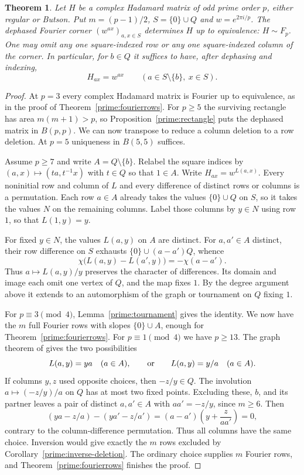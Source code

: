 \documentclass[11pt,a4paper]{article}
\newtheorem{theorem}{Theorem}[section]
\numberwithin{equation}{section}
\begin{document}
\begin{theorem}\label{prime:corner}
Let $H$ be a complex Hadamard matrix of odd prime order $p$, either regular or Butson. Put $m=(p-1)/2$, $S=\{0\}\cup Q$ and $w=e^{2\pi i/p}$. The dephased Fourier corner $(w^{ax})_{a,x\in S}$ determines $H$ up to equivalence: $H\sim F_p$. One may omit any one square-indexed row or any one square-indexed column of the corner. In particular, for $b\in Q$ it suffices to have, after dephasing and indexing,
$$H_{ax}=w^{ax}\qquad(a\in S\setminus\{b\},\ x\in S).$$
\end{theorem}
\begin{proof}
At $p=3$ every complex Hadamard matrix is Fourier up to equivalence, as in the proof of Theorem~\ref{prime:fourierrows}. For $p\ge5$ the surviving rectangle has area $m(m+1)>p$, so Proposition~\ref{prime:rectangle} puts the dephased matrix in $B(p,p)$. We can now transpose to reduce a column deletion to a row deletion. At $p=5$ uniqueness in $B(5,5)$ \cite{hkm} suffices.

Assume $p\ge7$ and write $A=Q\setminus\{b\}$. Relabel the square indices by $(a,x)\mapsto(ta,t^{-1}x)$ with $t\in Q$ so that $1\in A$. Write $H_{ax}=w^{L(a,x)}$. Every noninitial row and column of $L$ and every difference of distinct rows or columns is a permutation. Each row $a\in A$ already takes the values $\{0\}\cup Q$ on $S$, so it takes the values $N$ on the remaining columns. Label those columns by $y\in N$ using row $1$, so that $L(1,y)=y$.

For fixed $y\in N$, the values $L(a,y)$ on $A$ are distinct. For $a,a'\in A$ distinct, their row difference on $S$ exhausts $\{0\}\cup(a-a')Q$, whence
$$\chi\big(L(a,y)-L(a',y)\big)=-\chi(a-a').$$
Thus $a\mapsto L(a,y)/y$ preserves the character of differences. Its domain and image each omit one vertex of $Q$, and the map fixes $1$. By the degree argument above it extends to an automorphism of the graph or tournament on $Q$ fixing $1$.

For $p\equiv3\pmod4$, Lemma~\ref{prime:tournament} gives the identity. We now have the $m$ full Fourier rows with slopes $\{0\}\cup A$, enough for Theorem~\ref{prime:fourierrows}. For $p\equiv1\pmod4$ we have $p\ge13$. The graph theorem of \cite{mk} gives the two possibilities
\begin{equation}\label{prime:two-orientations}
L(a,y)=ya\quad(a\in A),\qquad\hbox{or}\qquad L(a,y)=y/a\quad(a\in A).
\end{equation}
If columns $y,z$ used opposite choices, then $-z/y\in Q$. The involution $a\mapsto(-z/y)/a$ on $Q$ has at most two fixed points. Excluding these, $b$, and its partner leaves a pair of distinct $a,a'\in A$ with $aa'=-z/y$, since $m\ge6$. Then
$$(ya-z/a)-(ya'-z/a')=(a-a')\left(y+\frac{z}{aa'}\right)=0,$$
contrary to the column-difference permutation. Thus all columns have the same choice. Inversion would give exactly the $m$ rows excluded by Corollary~\ref{prime:inverse-deletion}. The ordinary choice supplies $m$ Fourier rows, and Theorem~\ref{prime:fourierrows} finishes the proof.
\end{proof}
\end{document}
